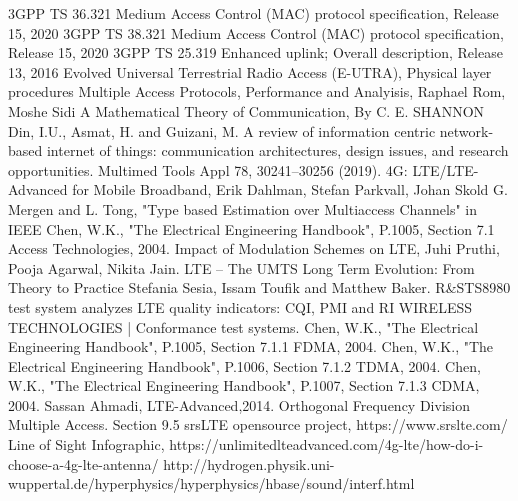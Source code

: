 \begin{thebibliography}{9}
3GPP TS 36.321 Medium Access Control (MAC) protocol specification, Release 15, 2020
3GPP TS 38.321 Medium Access Control (MAC) protocol specification, Release 15, 2020
3GPP TS 25.319 Enhanced uplink; Overall description, Release 13, 2016
Evolved Universal Terrestrial Radio Access (E-UTRA), Physical layer procedures 
Multiple Access Protocols, Performance and Analyisis, Raphael Rom, Moshe Sidi 
A Mathematical Theory of Communication, By C. E. SHANNON
Din, I.U., Asmat, H. and Guizani, M. A review of information centric network-based internet of things: communication architectures, design issues, and research opportunities. Multimed Tools Appl 78, 30241–30256 (2019). 
4G: LTE/LTE-Advanced for Mobile Broadband, Erik Dahlman, Stefan Parkvall, Johan Skold
G. Mergen and L. Tong, "Type based Estimation over Multiaccess Channels" in IEEE 
Chen, W.K., "The Electrical Engineering Handbook", P.1005, Section 7.1 Access Technologies, 2004.
Impact of Modulation Schemes on LTE, Juhi Pruthi, Pooja Agarwal, Nikita Jain.
LTE – The UMTS Long Term Evolution: From Theory to Practice Stefania Sesia, Issam Toufik and Matthew Baker.
R\&STS8980 test system analyzes LTE quality indicators: CQI, PMI and RI
WIRELESS TECHNOLOGIES | Conformance test systems. 
Chen, W.K., "The Electrical Engineering Handbook", P.1005, Section 7.1.1 FDMA, 2004. 
Chen, W.K., "The Electrical Engineering Handbook", P.1006, Section 7.1.2 TDMA, 2004.
Chen, W.K., "The Electrical Engineering Handbook", P.1007, Section 7.1.3 CDMA, 2004.
Sassan Ahmadi, LTE-Advanced,2014. Orthogonal Frequency Division Multiple Access. Section 9.5
srsLTE opensource project, https://www.srslte.com/ 
Line of Sight Infographic, https://unlimitedlteadvanced.com/4g-lte/how-do-i-choose-a-4g-lte-antenna/
http://hydrogen.physik.uni-wuppertal.de/hyperphysics/hyperphysics/hbase/sound/interf.html
\end{thebibliography}